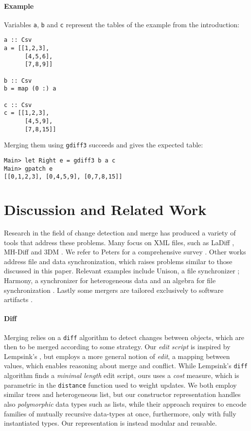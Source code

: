 \documentclass{sigplanconf}
\theoremstyle{plain}
\begin{document}
\paragraph{Example}
Variables \texttt{a}, \texttt{b} and \texttt{c} represent the tables
of the example from the introduction:
\begin{verbatim}
a :: Csv
a = [[1,2,3],
      [4,5,6],
      [7,8,9]]

b :: Csv
b = map (0 :) a

c :: Csv
c = [[1,2,3],
      [4,5,9],
      [7,8,15]]
\end{verbatim}
Merging them using \texttt{gdiff3} succeeds and gives the expected table:
\begin{verbatim}
Main> let Right e = gdiff3 b a c
Main> gpatch e
[[0,1,2,3], [0,4,5,9], [0,7,8,15]]
\end{verbatim}




\section{Discussion and Related Work}
\label{sec:related-work}
Research in the field of change detection and merge has produced a
variety of tools that address these problems.  Many focus on XML
files, such as LaDiff \cite{Chawathe96}, MH-Diff \cite{Chawathe97} and
3DM \cite{Lind04, Lind05}.  We refer to Peters for a
comprehensive survey \cite{PetersSurvey}.
%
Other works address file and data synchronization, which raises
problems similar to those discussed in this paper. Relevant examples
include Unison, a file synchronizer \cite{Pierce98, UnisonSpec};
Harmony, a synchronizer for heterogeneous data
\cite{HarmonyOverview,Pierce07} and an algebra for file
synchronization \cite{Ramsey01}.
%
Lastly some mergers are tailored exclusively to software artifacts
\cite{Westfechtel91, Mens02, Apel11}. 

\paragraph{Diff}
Merging relies on a \texttt{diff} algorithm to detect changes between
objects, which are then to be merged according to some strategy.
%
Our \emph{edit script} is inspired by Lempsink's \cite{Lemp09}, but
employs a more general notion of \emph{edit}, a mapping between
values, which enables reasoning about merge and conflict.
%
While Lempsink's \texttt{diff} algorithm finds a \emph{minimal length}
edit script, ours uses a \emph{cost} measure, which is parametric in
the \texttt{distance} function used to weight updates.  
%
We both employ similar trees and heterogeneous list, but our
constructor representation handles also \emph{polymorphic}
data types such as lists, while their approach requires 
to encode families of mutually recursive data-types
at once, furthermore, only with fully instantiated types.
Our representation is instead modular and reusable.
\end{document}
